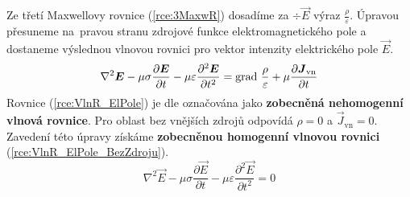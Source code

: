 Ze třetí Maxwellovy rovnice (\ref{rce:3MaxwR}) dosadíme za $\div\vec E$ výraz $\frac{\rho}{\varepsilon}$. Úpravou přesuneme na~pravou stranu zdrojové funkce elektromagnetického pole a dostaneme výslednou vlnovou rovnici pro vektor intenzity elektrického pole $\vec E$.
\begin{equation}
	\nabla^{2}\mbox{\boldmath$E$} -\mu\sigma\frac{\partial\mbox{\boldmath$E$}}{\partial t}-\mu\varepsilon\frac{\partial^{2}\mbox{\boldmath$E$}}{\partial t^{2}} = \mathrm{grad}\ \frac{\rho}{\varepsilon}+\mu\frac{\partial\mbox{\boldmath$J$}_{\mathrm{vn}}}{\partial t}
	\label{rce:VlnR_ElPole}
\end{equation}
Rovnice (\ref{rce:VlnR_ElPole}) je dle \cite{emp} označována jako {\bf zobecněná nehomogenní vlnová rovnice}. Pro oblast bez vnějších zdrojů 
odpovídá $\rho = 0$ a $\vec J_{\mathrm{vn}} = 0$. Zavedení této úpravy získáme {\bf zobecněnou homogenní vlnovou rovnici} (\ref{rce:VlnR_ElPole_BezZdroju}).
\begin{equation}
	\nabla^{2}\vec E -\mu\sigma\frac{\partial\vec E}{\partial t}-\mu\varepsilon\frac{\partial^{2}\vec E}{\partial t^{2}} = 0
	\label{rce:VlnR_ElPole_BezZdroju}
\end{equation}

